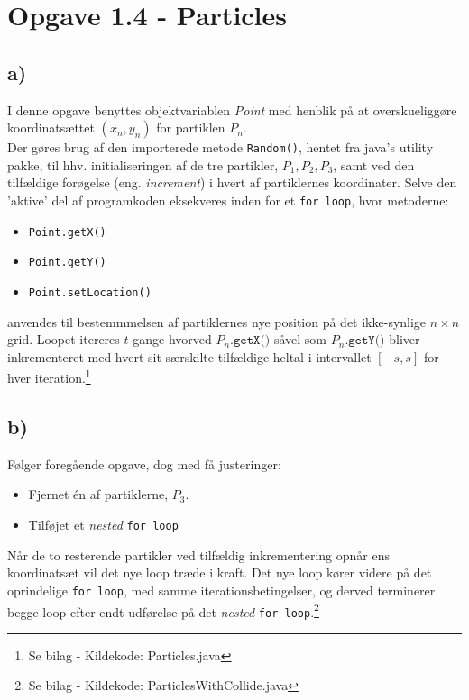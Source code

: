 \section{Opgave 1.4 - Particles}

\subsection*{a)}
I denne opgave benyttes objektvariablen \emph{Point} med henblik på at overskueliggøre koordinatsættet
$(x_n, y_n)$ for partiklen $P_n$.\\	
Der gøres brug af den importerede metode \texttt{Random()}, hentet fra java's utility pakke, til hhv. initialiseringen af de tre partikler,
$P_1, P_2, P_3$, samt ved den tilfældige forøgelse (eng. \emph{increment}) i hvert af partiklernes
koordinater. Selve den 'aktive' del af programkoden eksekveres inden for et \texttt{for loop}, hvor
metoderne:

\begin{itemize}
	\item \texttt{Point.getX()}
	\item \texttt{Point.getY()}	\item \texttt{Point.setLocation()}
\end{itemize}

anvendes til bestemmmelsen af partiklernes nye position på det ikke-synlige $n \times n$ grid. Loopet
itereres $t$ gange hvorved $P_n\texttt{.getX()}$ såvel som $P_n\texttt{.getY()}$ bliver inkrementeret med
hvert sit særskilte tilfældige heltal i intervallet $[-s, s]$ for hver iteration.\footnote{Se bilag - Kildekode: Particles.java}

\subsection*{b)}
Følger foregående opgave, dog med få justeringer:
\begin{itemize}
	\item Fjernet én af partiklerne, $P_3$.
	\item Tilføjet et \textit{nested} \texttt{for loop}
\end{itemize}
\noindent Når de to resterende partikler ved tilfældig inkrementering opnår ens koordinatsæt vil det nye loop træde i kraft. Det nye loop kører videre på det oprindelige \texttt{for loop}, med samme iterationsbetingelser, og derved terminerer begge loop efter endt udførelse på det \textit{nested} \texttt{for loop}.\footnote{Se bilag - Kildekode: ParticlesWithCollide.java}
